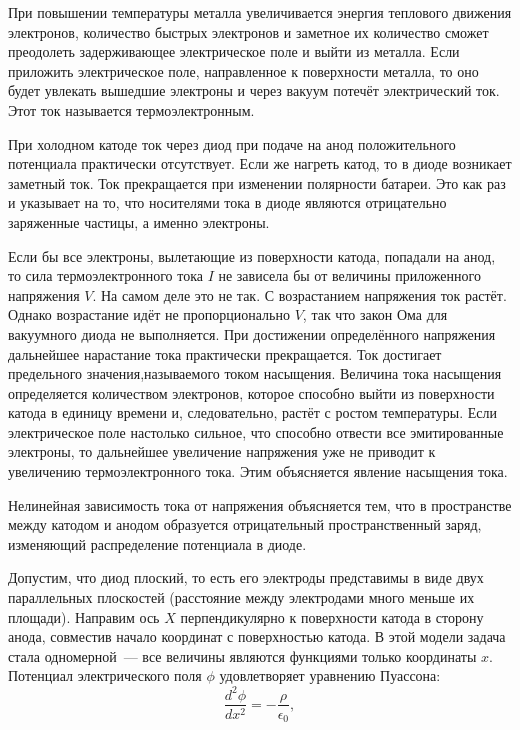 При повышении температуры металла увеличивается энергия теплового движения электронов, количество быстрых электронов и заметное их количество сможет преодолеть задерживающее электрическое поле и выйти из металла. Если приложить
электрическое поле, направленное к поверхности металла, то оно будет увлекать вышедшие электроны и через вакуум потечёт электрический ток. Этот ток называется {\textsf{термоэлектронным}}.

При холодном катоде ток через диод при подаче на анод положительного потенциала практически отсутствует. Если же нагреть катод, то в диоде возникает заметный ток. Ток прекращается при изменении полярности батареи. Это как раз и указывает на то, что носителями тока в диоде являются отрицательно заряженные частицы, а именно электроны.

Если бы все электроны, вылетающие из поверхности катода, попадали на анод, то сила термоэлектронного тока $I$ не
зависела бы от величины приложенного напряжения $V$. На самом деле это не так. С возрастанием напряжения ток растёт.
Однако возрастание идёт не пропорционально $V$, так что закон Ома для вакуумного диода не выполняется. При достижении определённого напряжения дальнейшее нарастание тока практически прекращается. Ток достигает предельного значения,называемого током насыщения. Величина тока насыщения определяется количеством электронов, которое способно выйти из поверхности катода в единицу времени и, следовательно, растёт с ростом температуры. Если электрическое поле настолько сильное, что способно отвести все эмитированные электроны, то дальнейшее увеличение напряжения уже не приводит к увеличению термоэлектронного тока. Этим объясняется явление насыщения тока.

Нелинейная зависимость тока от напряжения объясняется тем, что в пространстве между катодом и анодом образуется
отрицательный пространственный заряд, изменяющий распределение потенциала в диоде.

Допустим, что диод плоский, то есть его электроды представимы в виде двух параллельных плоскостей (расстояние между
электродами много меньше их площади). Направим ось $X$ перпендикулярно к поверхности катода в сторону анода, совместив начало координат с поверхностью катода. В этой модели задача стала одномерной~--- все величины являются функциями только координаты $x$. Потенциал электрического поля $\phi$ удовлетворяет уравнению Пуассона:
\begin{equation}
\frac{d^2\phi}{dx^2}=-\frac{\rho}{\epsilon_0},
\end{equation}

